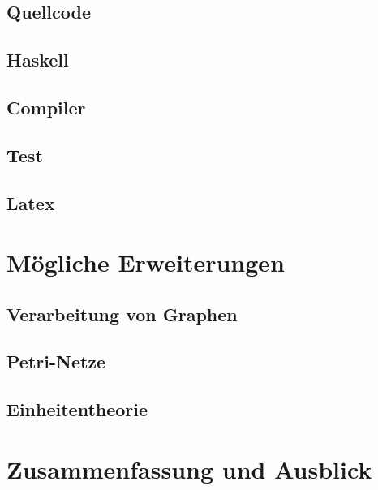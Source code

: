 \documentclass[a4paper, bibgerm]{article}
\begin{document}
\subsection{Quellcode}
\label{sec:lang:code}

\subsection{Haskell}
\label{sec:lang:haskell}

\subsection{Compiler}
\label{sec:lang:compiler}

\subsection{Test}
\label{sec:lang:test}

\subsection{Latex}
\label{sec:lang:latex}


\section{Mögliche Erweiterungen}
\label{sec:maybe}

\subsection{Verarbeitung von Graphen}
\label{sec:maybe:graphs}

\subsection{Petri-Netze}
\label{sec:maybe:petri}

\subsection{Einheitentheorie}
\label{sec:maybe:units}

\section{Zusammenfassung und Ausblick}
\label{sec:preview}
\end{document}
